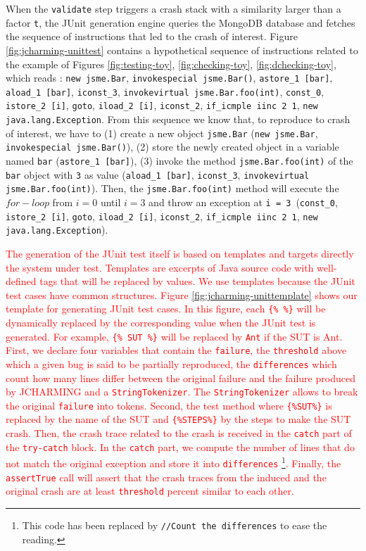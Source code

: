 \documentclass[times, doublespace]{smrauth}
\newcommand{\red}[1]{\textcolor{red}{#1}}
\begin{document}
{When the {\tt validate} step triggers a crash stack with a similarity larger than a factor {\tt t}, the JUnit generation engine queries the MongoDB database and fetches the sequence of instructions that led to the crash of interest.
Figure \ref{fig:jcharming-unittest} contains a hypothetical sequence
of instructions related to the example of Figures \ref{fig:testing-toy},
\ref{fig:checking-toy}, \ref{fig:dchecking-toy}, which reads : {\tt new jsme.Bar},
 {\tt invokespecial jsme.Bar()}, {\tt astore\_1 [bar]}, {\tt aload\_1 [bar]},
  {\tt iconst\_3}, {\tt invokevirtual jsme.Bar.foo(int)}, {\tt const\_0},
  {\tt istore\_2 [i]}, {\tt goto}, {\tt iload\_2 [i]}, {\tt iconst\_2},
  {\tt if\_icmple iinc 2 1}, {\tt new java.lang.Exception}.
From this sequence we know that, to reproduce to crash of interest, we have
to (1) create a new object {\tt jsme.Bar} ({\tt new jsme.Bar},
{\tt invokespecial jsme.Bar()}), (2) store the newly created object in a
variable named {\tt bar} ({\tt astore\_1 [bar]}), (3) invoke the method
{\tt jsme.Bar.foo(int)} of the {\tt bar} object with {\tt 3} as value
({\tt aload\_1 [bar]}, {\tt iconst\_3}, {\tt invokevirtual jsme.Bar.foo(int)}).
Then, the {\tt jsme.Bar.foo(int)} method will execute the $for-loop$ from $i=0$ until $i=3$ and
throw an exception at {\tt i = 3}~({\tt const\_0}, {\tt istore\_2 [i]}, {\tt goto},
{\tt iload\_2 [i]}, {\tt iconst\_2}, {\tt if\_icmple iinc 2 1}, {\tt new java.lang.Exception}).

\red{The generation of the JUnit test itself is based on templates and targets directly
the system under test. Templates are excerpts of Java source code with well-defined
tags that will be replaced by values. We use templates because the
JUnit test cases have common structures.
Figure \ref{fig:jcharming-unittemplate} shows our template for generating JUnit
test cases. In this figure, each {\tt \{\% \%\}} will be dynamically replaced by
the corresponding value when the JUnit test is generated. For example, {\tt \{\% SUT \%\}}
will be replaced by {\tt Ant} if the SUT is Ant.
First, we declare four variables that contain the {\tt failure},
the {\tt threshold} above which a given bug is said to be partially reproduced,
the {\tt differences} which count how many lines differ between the original
failure and the failure produced by JCHARMING and a {\tt StringTokenizer}.
The {\tt StringTokenizer} allows to break the original {\tt failure} into
tokens. Second, the test method where {\tt \{\%SUT\%\}} is replaced by the name
of the SUT and {\tt \{\%STEPS\%\}} by the steps to make the SUT crash.
Then, the crash trace related to the crash is received in the {\tt catch} part of
the {\tt try-catch} block. In the {\tt catch} part, we compute the number of lines
that do not match the original exception and store it into {\tt differences}
\footnote{This code has been replaced by {\tt //Count the differences} to ease the
reading.}. Finally, the {\tt assertTrue} call will assert that
the crash traces from the induced and the original crash are at least {\tt threshold}
 percent similar to each other.}


}
\end{document}
